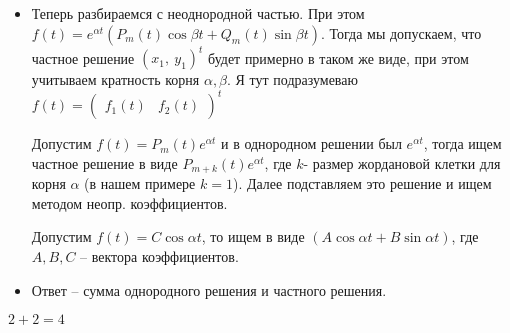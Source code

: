 \documentclass[11pt]{article}
\begin{document}
\begin{itemize}
		\item Теперь разбираемся с неоднородной частью. При этом $f(t) = e^{\alpha t}(P_m(t)\cos \beta t + Q_m(t)\sin \beta t)$. 
		Тогда мы допускаем, что частное решение $(x_1, \ y_1)^t$ будет примерно в таком же виде, при этом учитываем кратность корня $\alpha, \beta$. Я тут подразумеваю $f(t) = \begin{pmatrix}
			f_1(t) & f_2(t)
		\end{pmatrix}^t$

		Допустим $f(t) = P_m(t)e^{\alpha t}$ и в однородном решении был $e^{\alpha t}$, тогда ищем частное решение в виде $P_{m + k}(t)e^{\alpha t}$, где $k$- размер жордановой
		клетки для корня $\alpha$ (в нашем примере $k = 1$). Далее подставляем это решение и ищем методом неопр. коэффициентов.

		Допустим $f(t) = C\cos \alpha t$, то ищем в виде $(A \cos \alpha t + B \sin \alpha t)$, где $A, B, C$ -- вектора коэффициентов. 

		\item Ответ -- сумма однородного решения и частного решения.
	\end{itemize}
	$2 + 2 = 4$
	
\end{document}
